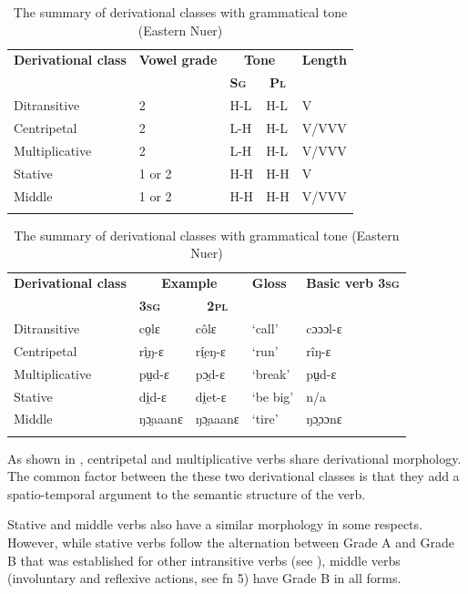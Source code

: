 \documentclass[output=paper
,newtxmath
,modfonts
,nonflat]{langsci/langscibook}
\begin{document}
\begin{table}
\begin{tabularx}{\textwidth}{Xllll}
\lsptoprule

\bfseries Derivational class & \bfseries Vowel grade & \multicolumn{2}{c}{\bfseries Tone} & {\bfseries Length}\\
&  & \bfseries\scshape Sg & \multicolumn{1}{c}{\bfseries\scshape Pl} &\\
\midrule
Ditransitive & 2 & H-L & H-L & V\\
Centripetal & 2 & L-H & H-L & V/VVV\\
Multiplicative & 2 & L-H & H-L & V/VVV\\
Stative & 1 or 2 & H-H & H-H & V\\
Middle & 1 or 2 & H-H & H-H & V/VVV\\
\lspbottomrule
\end{tabularx}
\begin{tabularx}{\textwidth}{Xllll}
\bfseries Derivational class & \multicolumn{2}{c}{\bfseries Example} & \bfseries Gloss & {\bfseries Basic  verb 3\textsc{sg}} \\
& \bfseries\scshape 3sg & \multicolumn{1}{c}{\bfseries\scshape 2pl} &  & \\
\midrule
Ditransitive & co̤lɛ & côlɛ & ‘call’ & cɔɔɔl-ɛ\\
Centripetal & rì̤ŋ-ɛ & rí̤eŋ-ɛ & ‘run’ & rîŋ-ɛ\\
Multiplicative & pṳd-ɛ & pɔ̤d-ɛ & ‘break’ & pṳd-ɛ\\
Stative & di̤d-ɛ & di̤et-ɛ & ‘be big’ & n/a\\
Middle & ŋɔ̤aaanɛ & ŋɔ̤aaanɛ & ‘tire’ & ŋɔ̤ɔɔnɛ\\
\lspbottomrule
\end{tabularx}
\caption{The summary of derivational classes with grammatical tone (Eastern Nuer)}
\label{tab:monich:15}
\end{table}

As shown in , centripetal and multiplicative verbs share derivational morphology.  The common factor between the these two derivational classes is that they add a spatio-temporal argument to the semantic structure of the verb.  

Stative and middle verbs also have a similar morphology in some respects.  However, while stative verbs follow the alternation between Grade A and Grade B that was established for other intransitive verbs (see ), middle verbs (involuntary and reflexive actions, see fn 5) have Grade B in all forms.
\end{document}
